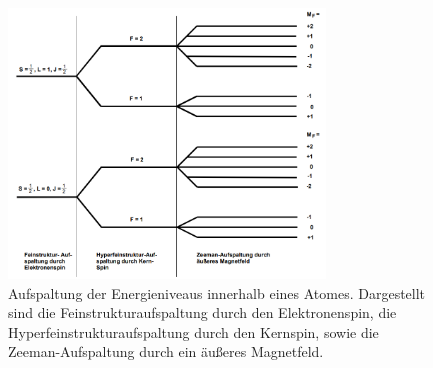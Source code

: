 \documentclass[
  bibliography=totoc,     %
  captions=tableheading,  %
  titlepage=firstiscover, %
]{scrartcl}
\begin{document}
\begin{figure}[h]
  \centering
  \includegraphics[width=0.75\textwidth]{Aufspaltung.jpg}
  \caption{Aufspaltung der Energieniveaus innerhalb eines Atomes. Dargestellt
  sind die Feinstrukturaufspaltung durch den Elektronenspin, die
  Hyperfeinstrukturaufspaltung durch den Kernspin, sowie die Zeeman-Aufspaltung
  durch ein äußeres Magnetfeld. \cite{anleitung}}
  \label{fig:aufspaltung}
\end{figure}
\end{document}
